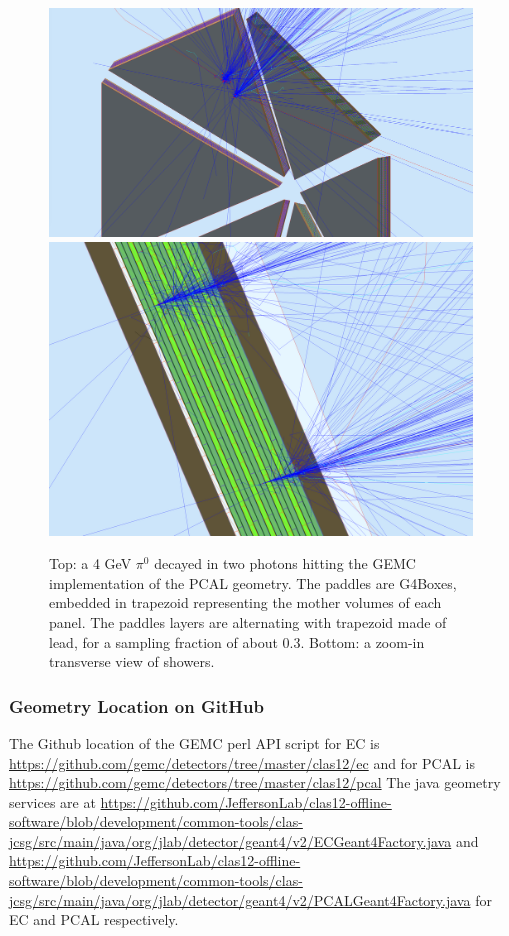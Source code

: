\begin{figure}
	\centering
	\includegraphics[width=0.99\columnwidth,keepaspectratio]{img/pcalGeometry.png}
	\includegraphics[width=0.99\columnwidth,keepaspectratio]{img/pcalDetail.png}
	\caption{Top: a 4 GeV $\pi^0$ decayed in two photons hitting the GEMC implementation of the PCAL geometry.
            The paddles are G4Boxes, embedded in trapezoid representing the mother volumes of each panel.
            The paddles layers are alternating with trapezoid made of lead, for a sampling fraction of about 0.3.
            Bottom: a zoom-in transverse view of showers.}
	\label{fig:pcalGeometry}
\end{figure}




\subsubsection{Geometry Location on GitHub}
The Github location of the GEMC perl API script for EC  is \url{https://github.com/gemc/detectors/tree/master/clas12/ec} and
for PCAL is \url{https://github.com/gemc/detectors/tree/master/clas12/pcal}
The java geometry services are at 
\url{https://github.com/JeffersonLab/clas12-offline-software/blob/development/common-tools/clas-jcsg/src/main/java/org/jlab/detector/geant4/v2/ECGeant4Factory.java} and
\url{https://github.com/JeffersonLab/clas12-offline-software/blob/development/common-tools/clas-jcsg/src/main/java/org/jlab/detector/geant4/v2/PCALGeant4Factory.java} for
EC and PCAL respectively.



